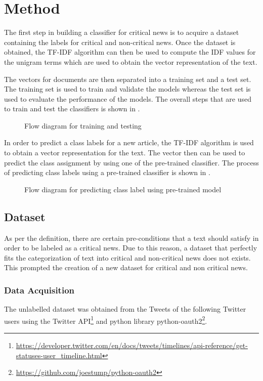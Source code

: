 \chapter{Method} \label{method}
The first step in building a classifier for critical news is to acquire a dataset containing the labels for critical and non-critical news. Once the dataset is obtained, the TF-IDF algorithm can then be used to compute the IDF values for the unigram terms which are used to obtain the vector representation of the text. 

The vectors for documents are then separated into a training set and a test set. The training set is used to train and validate the models whereas the test set is used to evaluate the performance of the models. The overall steps that are used to train and test the classifiers is shown in .

\begin{figure}[h]
    \caption{Flow diagram for training and testing}
    \label{fig:training}
\end{figure}

In order to predict a class labels for a new article, the TF-IDF algorithm is used to obtain a vector representation for the text. The vector then can be used to predict the class assignment by using one of the pre-trained classifier. The process of predicting class labels using a pre-trained classifier is shown in .

\begin{figure}[h]
    \caption{Flow diagram for predicting class label using pre-trained model}
    \label{fig:prediction}
\end{figure}

\section{Dataset}
As per the definition, there are certain pre-conditions that a text should satisfy in order to be labeled as a critical news. Due to this reason, a dataset that perfectly fits the categorization of text into critical and non-critical news does not exists. This prompted the creation of a new dataset for critical and non critical news.

\subsection{Data Acquisition}
The unlabelled dataset was obtained from the Tweets of the following Twitter users using the Twitter API\footnote{\url{https://developer.twitter.com/en/docs/tweets/timelines/api-reference/get-statuses-user_timeline.html}} and python library python-oauth2\footnote{\url{https://github.com/joestump/python-oauth2}}.

